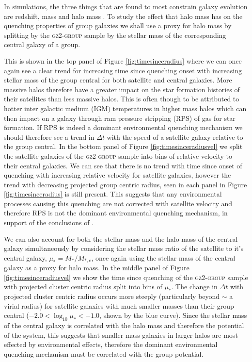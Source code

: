 In simulations, the three things that are found to most constrain galaxy evolution are redshift, mass and halo mass \cite{ref, ref}. To study the effect that halo mass has on the quenching properties of group galaxies we shall use a proxy for halo mass by splitting by the \textsc{gz2-group} sample by the stellar mass of the corresponding central galaxy of a group.

This is shown in the top panel of Figure \ref{fig:timesinceradius} where we can once again see a clear trend for increasing time since quenching onset with increasing stellar mass of the group central for both satellite and central galaxies. More massive halos therefore have a greater impact on the star formation histories of their satellites than less massive halos. This is often though to be attributed to hotter inter galactic medium (IGM) temperatures in higher mass halos which can then impact on a galaxy through ram pressure stripping (RPS) of gas for star formation. If RPS is indeed a dominant environmental quenching mechanism we should therefore see a trend in $\Delta t$ with the speed of a satellite galaxy relative to the group central.  In the bottom panel of Figure \ref{fig:timesinceradiusvel} we split the satellite galaxies of the \textsc{gz2-group} sample into bins of relative velocity to their central galaxies. We can see that there is no trend with time since onset of quenching with increasing relative velocity for satellite galaxies, however the trend with decreasing projected group centric radius, seen in each panel in Figure \ref{fig:timesinceradius} is still present. This suggests that any environmental processes causing this quenching are not corrected with satellite velocity and therefore RPS is not the dominant environmental quenching mechanism, in support of the conclusions of \citep{?}.

We can also account for both the stellar mass and the halo mass of the central galaxy simultaneously by considering the stellar mass ratio of the satellite to it's central galaxy, $\mu_* = M_*/M_{*,c}$, once again using the stellar mass of the central galaxy as a proxy for halo mass. In the middle panel of Figure \ref{fig:timesinceradiusvel} we show the time since quenching of the \textsc{gz2-group} sample with projected cluster centric radius split into bins of $\mu_*$. The change in $\Delta t $ with projected cluster centric radius occurs more steeply (particularly beyond $\sim$ a virial radius) for satellite galaxies with much smaller masses than their group central ($-2.0 < \log_{10}\mu_* < -1.0$, shown by the blue curve). Since the stellar mass of the central galaxy is correlated with the halo mass and therefore the potential of the system, this suggests that smaller mass galaxies in larger halos are most effected by environmental effects, therefore the dominant environmental quenching mechanism must be correlated with the group potential. 

